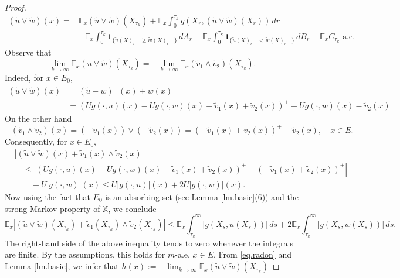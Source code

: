 \documentclass[11pt,a4paper,reqno]{amsart}
\theoremstyle{definition}
\numberwithin{equation}{section}
\begin{document}
\begin{proof}
\begin{equation}
\label{eq.ttlim}
\begin{split}
(\tilde u \vee \tilde w)(x)= & \mathbb{E}_x(\tilde u \vee \tilde w)\left(X_{\tau_k}\right)
+\mathbb{E}_x \int_0^{\tau_k} g\left(X_r,(\tilde u \vee \tilde w)\left(X_r\right)\right) \,d r \\
& -\mathbb{E}_x \int_0^{\tau_k} \mathbf{1}_{\{\tilde u(X)_{r-} \geq \tilde w(X)_{r-}\}} \,d A_r
-\mathbb{E}_x \int_0^{\tau_k} \mathbf{1}_{\{\tilde u(X)_{r-} < \tilde w(X)_{r-}\}} \,d B_r-\mathbb{E}_x C_{\tau_k} \text { a.e. }
\end{split}
\end{equation}
Observe that
\begin{equation}
\label{eq.radon}
\lim_{k\to\infty}\mathbb{E}_x(\tilde u \vee \tilde w)\left(X_{\tau_k}\right)
=-\lim_{k\to\infty}\mathbb{E}_x( \tilde v_1\wedge \tilde v_2)\left(X_{\tau_k}\right).
\end{equation}
Indeed, for $x\in E_0$,
\[
\begin{split}
(\tilde u\vee \tilde w)(x)&=(\tilde u-\tilde w)^+(x)+\tilde w(x)\\&= \left(Ug(\cdot,u)(x)
-Ug(\cdot,w)(x)-\tilde v_1(x)+\tilde v_2(x)\right)^+ +Ug(\cdot,w)(x)-\tilde v_2(x)
\end{split}
\]
On the other hand
\[
-(\tilde v_1\wedge \tilde v_2)(x)=(-\tilde v_1(x))\vee (-\tilde v_2(x))= (-\tilde v_1(x)+\tilde v_2(x))^+-\tilde v_2(x),\quad x\in E.
\]
Consequently, for $x\in E_0$,
\[
\begin{split}
&|(\tilde u\vee \tilde w)(x)+\tilde v_1(x)\wedge \tilde v_2(x)|\\&\quad
\le \left| \left(Ug(\cdot, u)(x)-Ug(\cdot, w)(x)-\tilde v_1(x)+\tilde v_2(x)\right)^+- (-\tilde v_1(x)+\tilde v_2(x))^+ \right|
\\&\quad\quad+U|g(\cdot, w)|(x)
\le U|g(\cdot, u)|(x)+2U|g(\cdot, w)|(x).
\end{split}
\]
Now using the fact that $E_0$ is an absorbing set (see Lemma \ref{lm.basic}(6)) and the 
strong Markov property of $\mathbb X$, we conclude
\[
\mathbb E_x|(\tilde u\vee \tilde w)(X_{\tau_k})+\tilde v_1(X_{\tau_k})\wedge \tilde v_2(X_{\tau_k})|
\le \mathbb E_x\int_{\tau_k}^\infty|g(X_s, u(X_s))|\,ds+2\mathbb E_x\int_{\tau_k}^\infty|g(X_s, w(X_s))|\,ds.
\]
The right-hand side of the above inequality tends to zero whenever the  integrals are finite. 
By the assumptions, this holds for  $m$-a.e. $x\in E$.
From \eqref{eq.radon} and  Lemma \ref{lm.basic}, we infer  that 
$h(x):=-\lim_{k\to\infty}\mathbb{E}_x(\tilde u \vee \tilde w)\left(X_{\tau_k}\right)$

\end{proof}
\end{document}

